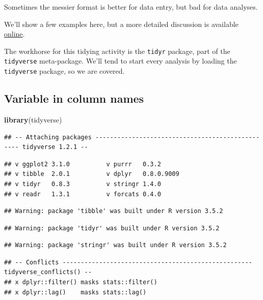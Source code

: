 \documentclass[12pt,letterpaperpaper,openany]{book}
\newenvironment{Shaded}{\begin{snugshade}}{\end{snugshade}}
\newcommand{\KeywordTok}[1]{\textcolor[rgb]{0.13,0.29,0.53}{\textbf{#1}}}
\newcommand{\NormalTok}[1]{#1}
\begin{document}
Sometimes the messier format is better for data entry, but bad for data analyses.

We'll show a few examples here, but a more detailed discussion is available \href{https://cran.r-project.org/web/packages/tidyr/vignettes/tidy-data.html}{online}.

The workhorse for this tidying activity is the \texttt{tidyr} package, part of the \texttt{tidyverse}
meta-package. We'll tend to start every analysis by loading the \texttt{tidyverse} package,
so we are covered.

\hypertarget{variable-in-column-names}{%
\subsection{Variable in column names}\label{variable-in-column-names}}

\begin{Shaded}
\begin{Highlighting}[]
\KeywordTok{library}\NormalTok{(tidyverse)}
\end{Highlighting}
\end{Shaded}

\begin{verbatim}
## -- Attaching packages ------------------------------------------------- tidyverse 1.2.1 --
\end{verbatim}

\begin{verbatim}
## v ggplot2 3.1.0          v purrr   0.3.2     
## v tibble  2.0.1          v dplyr   0.8.0.9009
## v tidyr   0.8.3          v stringr 1.4.0     
## v readr   1.3.1          v forcats 0.4.0
\end{verbatim}

\begin{verbatim}
## Warning: package 'tibble' was built under R version 3.5.2
\end{verbatim}

\begin{verbatim}
## Warning: package 'tidyr' was built under R version 3.5.2
\end{verbatim}

\begin{verbatim}
## Warning: package 'stringr' was built under R version 3.5.2
\end{verbatim}

\begin{verbatim}
## -- Conflicts ---------------------------------------------------- tidyverse_conflicts() --
## x dplyr::filter() masks stats::filter()
## x dplyr::lag()    masks stats::lag()
\end{verbatim}
\end{document}
